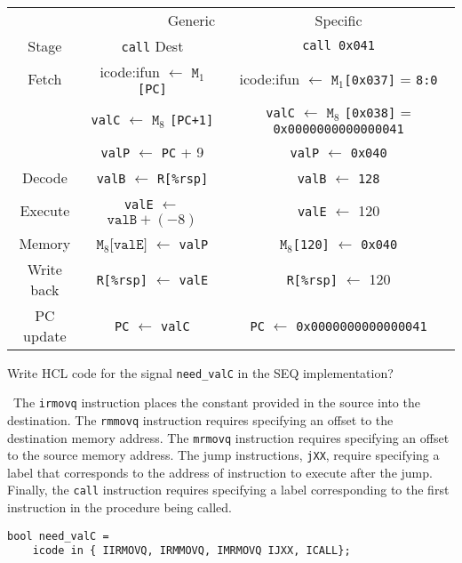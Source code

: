 \documentclass[12pt]{article}
\newenvironment{ex}[2][Exercise]{\begin{trivlist}
		\item[\hskip \labelsep {\bfseries #1}\hskip \labelsep {\bfseries #2.}]}{\end{trivlist}}
\newenvironment{sol}[1][Solution]{\begin{trivlist}
		\item[\hskip \labelsep {\bfseries #1:}]}{\end{trivlist}}
\begin{document}
\begin{sol}
	\
	\begin{center}
		\begin{tabular}{ccc}
			\multicolumn{2}{r}{Generic} & Specific\\
			Stage & \texttt{call} Dest & \texttt{call 0x041}\\
			\hline
			Fetch & icode:ifun $\leftarrow$ $\texttt{M}_1$\texttt{[PC]}&
			 icode:ifun $\leftarrow$ $\texttt{M}_1$\texttt{[\texttt{0x037}]} = \texttt{8:0}\\
			
			{}&\texttt{valC} $\leftarrow$ $\texttt{M}_8$ \texttt{[PC+1]} & \texttt{valC} $\leftarrow$ $\texttt{M}_8$ \texttt{[0x038]} = 
			\texttt{0x0000000000000041}
			\\
			
			{} & \texttt{valP} $\leftarrow$ \texttt{PC} + 9 &
			\texttt{valP} $\leftarrow$ \texttt{0x040}\\
			
			Decode & \texttt{valB} $\leftarrow$ \texttt{R[\%rsp]} &
			\texttt{valB} $\leftarrow$ \texttt{128}\\
			 
			Execute & \texttt{valE} $\leftarrow$ $\texttt{valB} + (-8)$ &
			\texttt{valE} $\leftarrow$ 120\\
			
			Memory & $\texttt{M}_8\texttt{[valE]}$ $\leftarrow$ \texttt{valP} &
			$\texttt{M}_8$\texttt{[120]} $\leftarrow$ \texttt{0x040}\\
			
			Write back & \texttt{R[\%rsp]} $\leftarrow$ \texttt{valE} &
			\texttt{R[\%rsp]} $\leftarrow$ 120\\
			
			PC update& \texttt{PC} $\leftarrow$ \texttt{valC} &
			\texttt{PC} $\leftarrow$ \texttt{0x0000000000000041}
		\end{tabular}
	\end{center}
\end{sol}

\begin{ex}{4.19}
	Write HCL code  for the signal \texttt{need\_valC} in the SEQ  
	implementation?
\end{ex}

\begin{sol}
	\
	The \texttt{irmovq} instruction places the constant provided in
	the source into the destination. The \texttt{rmmovq} instruction
	requires specifying an  offset to the destination memory address.
	The \texttt{mrmovq} instruction requires specifying an offset to
	the source memory address. The jump instructions, \texttt{jXX}, require specifying
	a label that corresponds to the address of instruction to execute
	after the jump. Finally, the \texttt{call} instruction requires specifying
	a label corresponding to the first instruction in the procedure being
	called.
	\begin{lstlisting}[language={}]
bool need_valC = 
	icode in { IIRMOVQ, IRMMOVQ, IMRMOVQ IJXX, ICALL};
	\end{lstlisting}
\end{sol}
\end{document}
